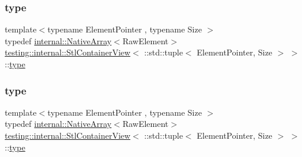 \mbox{\label{classtesting_1_1internal_1_1_stl_container_view_3_01_1_1std_1_1tuple_3_01_element_pointer_00_01_size_01_4_01_4_aaa0289cd65ef99ea632d2fb0ad5480eb}} 
\subsubsection{\texorpdfstring{type}{type}\hspace{0.1cm}{\footnotesize\ttfamily [1/2]}}
{\footnotesize\ttfamily template$<$typename Element\+Pointer , typename Size $>$ \\
typedef \mbox{\hyperlink{classtesting_1_1internal_1_1_native_array}{internal\+::\+Native\+Array}}$<$Raw\+Element$>$ \mbox{\hyperlink{classtesting_1_1internal_1_1_stl_container_view}{testing\+::internal\+::\+Stl\+Container\+View}}$<$ \+::std\+::tuple$<$ Element\+Pointer, Size $>$ $>$\+::\mbox{\hyperlink{classtesting_1_1internal_1_1_stl_container_view_3_01_1_1std_1_1tuple_3_01_element_pointer_00_01_size_01_4_01_4_aaa0289cd65ef99ea632d2fb0ad5480eb}{type}}}

\mbox{\label{classtesting_1_1internal_1_1_stl_container_view_3_01_1_1std_1_1tuple_3_01_element_pointer_00_01_size_01_4_01_4_aaa0289cd65ef99ea632d2fb0ad5480eb}} 
\subsubsection{\texorpdfstring{type}{type}\hspace{0.1cm}{\footnotesize\ttfamily [2/2]}}
{\footnotesize\ttfamily template$<$typename Element\+Pointer , typename Size $>$ \\
typedef \mbox{\hyperlink{classtesting_1_1internal_1_1_native_array}{internal\+::\+Native\+Array}}$<$Raw\+Element$>$ \mbox{\hyperlink{classtesting_1_1internal_1_1_stl_container_view}{testing\+::internal\+::\+Stl\+Container\+View}}$<$ \+::std\+::tuple$<$ Element\+Pointer, Size $>$ $>$\+::\mbox{\hyperlink{classtesting_1_1internal_1_1_stl_container_view_3_01_1_1std_1_1tuple_3_01_element_pointer_00_01_size_01_4_01_4_aaa0289cd65ef99ea632d2fb0ad5480eb}{type}}}



